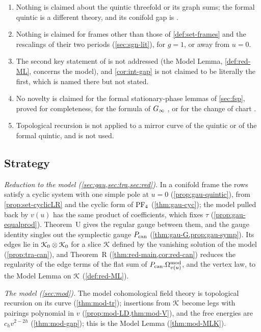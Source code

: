 \begin{enumerate}
\item Nothing is claimed about the quintic threefold or its graph sums; the formal quintic is a different theory, and its conifold gap is \cite[Theorem~2]{CGYZ26}.
\item Nothing is claimed for frames other than those of \cref{def:set-frames} and the rescalings of their two periods (\cref{sec:sgn-lit}), for $g=1$, or away from $u=0$.
\item The second key statement of \cite[Remark~1.9]{CGYZ26} is not addressed (the Model Lemma, \cref{def:red-ML}, concerns the model), and \cref{cor:int-gap} is not claimed to be literally the first, which is named there but not stated.
\item No novelty is claimed for the formal stationary-phase lemmas of \cref{sec:fsp}, proved for completeness, for the formula of $G_{\infty}$ \cite[Lemma~7.7, (37)]{GJR18}, or for the change of chart \cite[\S10]{MR1901075}.
\item Topological recursion is not applied to a mirror curve of the quintic or of the formal quintic, and \cite{FCCZ26} is not used.
\end{enumerate}

\subsection{Strategy}
\label{sec:int-strategy}

\emph{Reduction to the model (\cref{sec:gau,sec:tra,sec:red}).} In a conifold frame the rows satisfy a cyclic system with one simple pole at $u=0$ (\cref{prop:gau-quintic}), from \cref{prop:set-cyclicLR} and the cyclic form of $\mathrm{PF}_{4}$ (\cref{thm:gau-cyc}); the model pulled back by $v(u)$ has the same product of coefficients, which fixes $\tau$ (\cref{prop:gau-equalprod}). Theorem~U gives the regular gauge between them, and the gauge identity singles out the symplectic gauge $P_{\mathrm{can}}$ (\cref{thm:gau-G,prop:gau-symp}). Its edges lie in $\mathcal{K}_{0}\otimes\mathcal{K}_{0}$ for a slice $\mathcal{K}$ defined by the vanishing solution of the model (\cref{prop:tra-can}), and Theorem~R (\cref{thm:red-main,cor:red-can}) reduces the regularity of the edge terms of the flat sum of $P_{\mathrm{can}}.\Omega^{\mathrm{mod}}_{v(u)}$, and the vertex law, to the Model Lemma on $\mathcal{K}$ (\cref{def:red-ML}).

\emph{The model (\cref{sec:mod}).} The model cohomological field theory is topological recursion on its curve (\cref{thm:mod-tr}); insertions from $\mathcal{K}$ become legs with pairings polynomial in $v$ (\cref{prop:mod-LD,thm:mod-V}), and the free energies are $c_hv^{2-2h}$ (\cref{thm:mod-gap}); this is the Model Lemma (\cref{thm:mod-MLK}).

